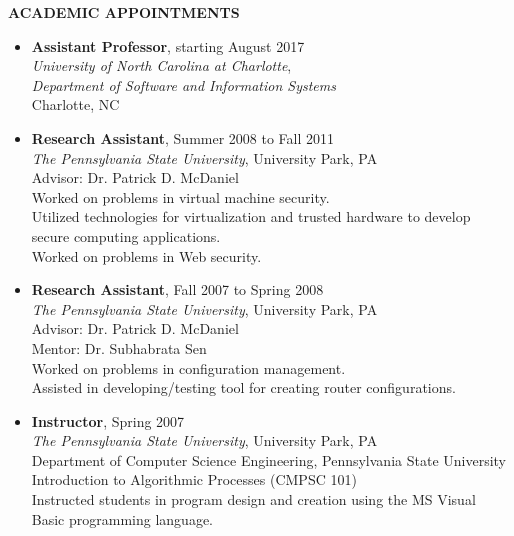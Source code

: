 \documentclass[10pt]{article}
\begin{document}
\vspace{1em} {\Large \textbf{ACADEMIC APPOINTMENTS}}
\begin{itemize}
\item \textbf{Assistant Professor}, starting August 2017\\
  \textit{University of North Carolina at Charlotte},\\
  \textit{Department of Software and Information Systems}\\
  Charlotte, NC\\

\item \textbf{Research Assistant}, Summer 2008 to Fall 2011\\
  \textit{The Pennsylvania State University},
  University Park, PA\\
  Advisor: Dr. Patrick D. McDaniel\\
  Worked on problems in virtual machine security.\\
  Utilized technologies for virtualization and trusted hardware to develop secure computing applications.\\
  Worked on problems in Web security.

\item \textbf{Research Assistant}, Fall 2007 to Spring 2008\\
  \textit{The Pennsylvania State University},
  University Park, PA\\
  Advisor: Dr. Patrick D. McDaniel\\
  Mentor: Dr. Subhabrata Sen\\
  Worked on problems in configuration management.\\
  Assisted in developing/testing tool for creating router configurations.

\item \textbf{Instructor}, Spring 2007\\
  \textit{The Pennsylvania State University},
  University Park, PA\\
  Department of Computer Science Engineering, Pennsylvania State University\\
  Introduction to Algorithmic Processes (CMPSC 101)\\
  Instructed students in program design and creation using the MS Visual Basic programming language.
\end{itemize}
\end{document}
